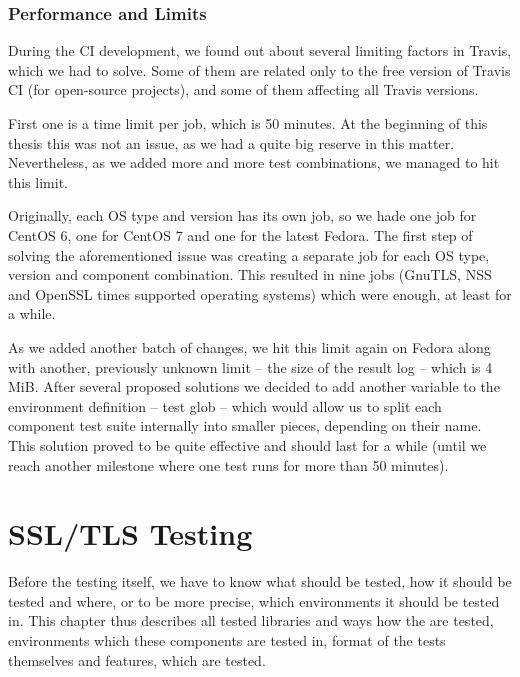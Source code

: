 \subsection{Performance and Limits} \label{ref:performance-limits}
    During the CI development, we found out about several limiting factors
    in Travis, which we had to solve. Some of them are related only to
    the free version of Travis CI (for open-source projects), and some
    of them affecting all Travis versions.

    First one is a time limit per job, which is 50 minutes. At the beginning
    of this thesis this was not an issue, as we had a quite big reserve in
    this matter. Nevertheless, as we added more and more test combinations,
    we managed to hit this limit.

    Originally, each OS type and version has its own job, so we hade one job
    for CentOS 6, one for CentOS 7 and one for the latest Fedora. The first
    step of solving the aforementioned issue
    was creating a separate job for each OS type, version and component
    combination. This resulted in nine jobs (GnuTLS, NSS and OpenSSL times
    supported operating systems) which were enough, at least for a while.

    As we added another batch of changes, we hit this limit again on Fedora
    along with another, previously unknown limit -- the size of the result log
    -- which is 4 MiB.
    After several proposed solutions we decided to add another variable
    to the environment definition -- test glob -- which would allow us to split
    each component test suite internally into smaller pieces, depending on their
    name. This solution proved to be quite effective and should last for
    a while (until we reach another milestone where one test runs for more than
    50 minutes).


\chapter {SSL/TLS Testing} \label{chap:ssl_tls_testing}
    Before the testing itself, we have to know what should be tested, how it
    should be tested and where, or to be more precise, which environments it
    should be tested in. This chapter thus describes all tested libraries
    and ways how the are tested, environments which these components are
    tested in, format of the tests themselves and features, which are tested.

